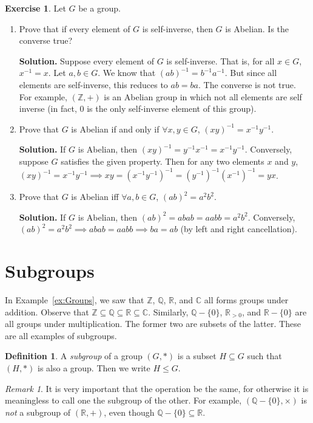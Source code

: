 \documentclass[svgnames]{article}
\theoremstyle{definition}
\newtheorem{Definition}[Theorem]{Definition}
\newtheorem{Exercise}{Exercise}[section]
\theoremstyle{remark}
\newtheorem*{Remark*}{Remark}
\begin{document}
\begin{Exercise}
Let $G$ be a group.
\begin{enumerate}
\item\label{it:Ord2=>Abelian} Prove that if every element of $G$ is self-inverse, then $G$ is Abelian. Is the converse true?

\textbf{Solution.} Suppose every element of $G$ is self-inverse. That is, for all $x \in G$, $x^{-1} = x$. Let $a, b \in G$. We know that $(ab)^{-1} = b^{-1} a^{-1}$. But since all elements are self-inverse, this reduces to $ab = ba$. The converse is not true. For example, $(\mathbb Z, +)$ is an Abelian group in which not all elements are self inverse (in fact, $0$ is the only self-inverse element of this group).

\item Prove that $G$ is Abelian if and only if $\forall x, y \in G$, $(xy)^{-1} = x^{-1}y^{-1}$.

\textbf{Solution.} If $G$ is Abelian, then $(xy)^{-1} = y^{-1} x^{-1} = x^{-1} y^{-1}$. Conversely, suppose $G$ satisfies the given property. Then for any two elements $x$ and $y$, $(xy)^{-1} = x^{-1} y^{-1} \implies xy = (x^{-1} y^{-1})^{-1} = (y^{-1})^{-1} (x^{-1})^{-1} = yx$.

\item Prove that $G$ is Abelian iff $\forall a, b \in G$, $(ab)^2 = a^2 b^2$.

\textbf{Solution.} If $G$ is Abelian, then $(ab)^2 = abab = aabb = a^2b^2$. Conversely, $(ab)^2 = a^2 b^2 \implies abab = aabb \implies ba = ab$ (by left and right cancellation).
\end{enumerate}
\end{Exercise}

\section{Subgroups}\label{sec:Subgroups}
In Example~\ref{ex:Groups}, we saw that $\mathbb Z$, $\mathbb Q$, $\mathbb R$, and $\mathbb C$ all forms groups under addition. Observe that $\mathbb Z \subseteq \mathbb Q \subseteq \mathbb R \subseteq \mathbb C$. Similarly, $\mathbb Q - \{0\}$, $\mathbb R_{>0}$, and $\mathbb R - \{0\}$ are all groups under multiplication. The former two are subsets of the latter. These are all examples of subgroups.
\begin{Definition}\label{def:Subgroup}
A \emph{subgroup} of a group $(G, *)$ is a subset $H \subseteq G$ such that $(H, *)$ is also a group. Then we write $H \le G$.
\end{Definition}
\begin{Remark*}
It is very important that the operation be the same, for otherwise it is meaningless to call one the subgroup of the other. For example, $(\mathbb Q - \{0\}, \times)$ is \textit{not} a subgroup of $(\mathbb R, +)$, even though $\mathbb Q - \{0\} \subseteq \mathbb R$.
\end{Remark*}
\end{document}
